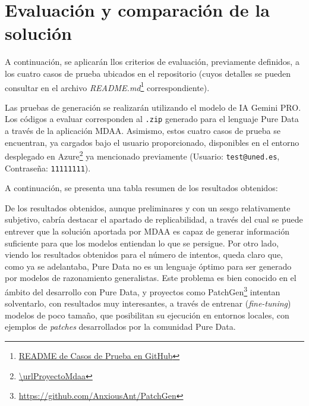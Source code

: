 \section{Evaluación y comparación de la solución}

A continuación, se aplicarán llos criterios de evaluación, previamente definidos, a los cuatro casos de prueba ubicados en el repositorio (cuyos detalles se pueden consultar en el archivo \textit{README.md}\footnote{\href{\urlProyectoCasosPrueba/README.md}{README de Casos de Prueba en GitHub}} correspondiente).

Las pruebas de generación se realizarán utilizando el modelo de IA Gemini PRO. Los códigos a evaluar corresponden al \texttt{.zip} generado para el lenguaje Pure Data a través de la aplicación MDAA. Asimismo, estos cuatro casos de prueba se encuentran, ya cargados bajo el usuario proporcionado, disponibles en el entorno desplegado en Azure\footnote{\url{\urlProyectoMdaa}} ya mencionado previamente (Usuario: \texttt{test@uned.es}, Contraseña: \texttt{11111111}).

A continuación, se presenta una tabla resumen de los resultados obtenidos:
 
\begin{table}[htbp]
    \centering
    \caption{Evaluación de casos de prueba con Gemini PRO para Pure Data}
    \label{tab:evaluacion_casos}
\end{table}

De los resultados obtenidos, aunque preliminares y con un sesgo relativamente subjetivo, cabría destacar el apartado de replicabilidad, a través del cual se puede entrever que la solución aportada por MDAA es capaz de generar información suficiente para que los modelos entiendan lo que se persigue. Por otro lado, viendo los resultados obtenidos para el número de intentos, queda claro que, como ya se adelantaba, Pure Data no es un lenguaje óptimo para ser generado por modelos de razonamiento generalistas. Este problema es bien conocido en el ámbito del desarrollo con Pure Data, y proyectos como PatchGen\footnote{\url{https://github.com/AnxiousAnt/PatchGen}} intentan solventarlo, con resultados muy interesantes, a través de entrenar (\textit{fine-tuning}) modelos de poco tamaño, que posibilitan su ejecución en entornos locales, con ejemplos de \textit{patches} desarrollados por la comunidad Pure Data.
